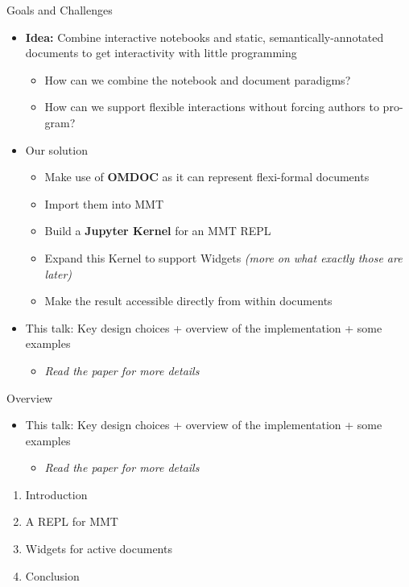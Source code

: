 \documentclass{beamer}
\begin{document}
    \begin{frame}{Goals and Challenges}
        \begin{itemize}
            \item \textbf{Idea:} Combine interactive notebooks and static, semantically-annotated documents to get interactivity with little programming
            \begin{itemize}
                \item How can we combine the notebook and document paradigms?
                \item How can we support flexible interactions without forcing authors to pro-
gram?
            \end{itemize}

            \item Our solution
            \begin{itemize}
                \item Make use of \textbf{OMDOC} as it can represent flexi-formal documents
                \item Import them into MMT
                \item Build a \textbf{Jupyter Kernel} for an MMT REPL
                \item Expand this Kernel to support Widgets \textit{(more on what exactly those are later)}
                \item Make the result accessible directly from within documents
            \end{itemize}

            \item This talk: Key design choices + overview of the implementation + some examples
            \begin{itemize}
                \item \textit{Read the paper for more details}
            \end{itemize}
        \end{itemize}
    \end{frame}

    \begin{frame}{Overview}

        \begin{itemize}
            \item This talk: Key design choices + overview of the implementation + some examples
            \begin{itemize}
                \item \textit{Read the paper for more details}
            \end{itemize}
        \end{itemize}

        \begin{enumerate}
            \item Introduction
            \item A REPL for MMT
            \item Widgets for active documents
            \item Conclusion
        \end{enumerate}
    \end{frame}
\end{document}
